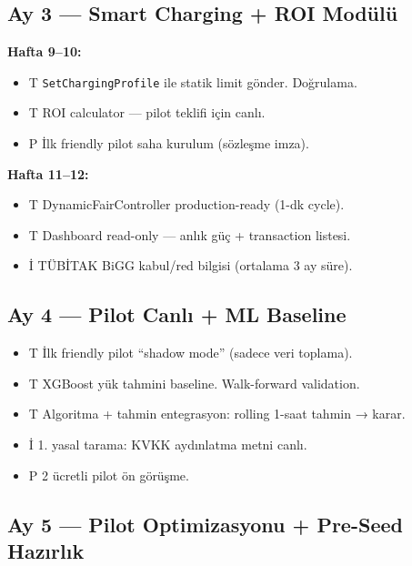 \documentclass[11pt,a4paper]{article}
\begin{document}
\subsection*{Ay 3 — Smart Charging + ROI Modülü}

\textbf{Hafta 9--10:}
\begin{itemize}
    \item {\color{blue!50!black}T} \texttt{SetChargingProfile} ile statik limit gönder. Doğrulama.
    \item {\color{blue!50!black}T} ROI calculator — pilot teklifi için canlı.
    \item {\color{green!50!black}P} İlk friendly pilot saha kurulum (sözleşme imza).
\end{itemize}

\textbf{Hafta 11--12:}
\begin{itemize}
    \item {\color{blue!50!black}T} DynamicFairController production-ready (1-dk cycle).
    \item {\color{blue!50!black}T} Dashboard read-only — anlık güç + transaction listesi.
    \item {\color{red!50!black}İ} TÜBİTAK BiGG kabul/red bilgisi (ortalama 3 ay süre).
\end{itemize}

\subsection*{Ay 4 — Pilot Canlı + ML Baseline}

\begin{itemize}
    \item {\color{blue!50!black}T} İlk friendly pilot ``shadow mode'' (sadece veri toplama).
    \item {\color{blue!50!black}T} XGBoost yük tahmini baseline. Walk-forward validation.
    \item {\color{blue!50!black}T} Algoritma + tahmin entegrasyon: rolling 1-saat tahmin → karar.
    \item {\color{red!50!black}İ} 1. yasal tarama: KVKK aydınlatma metni canlı.
    \item {\color{green!50!black}P} 2 ücretli pilot ön görüşme.
\end{itemize}

\subsection*{Ay 5 — Pilot Optimizasyonu + Pre-Seed Hazırlık}
\end{document}
